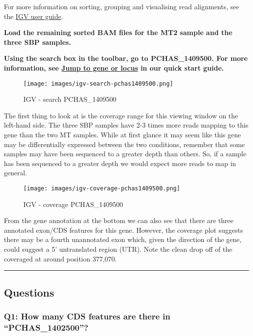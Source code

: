\documentclass[11pt]{article}
\begin{document}
    For more information on sorting, grouping and visualising read
alignments, see the
\href{http://software.broadinstitute.org/software/igv/UserGuide}{IGV
user guide}.

\textbf{Load the remaining sorted BAM files for the MT2 sample and the
three SBP samples.}

\textbf{Using the search box in the toolbar, go to PCHAS\_1409500. For
more information, see
\href{https://github.com/sanger-pathogens/pathogen-informatics-training/blob/master/Notebooks/IGV/index.ipynb}{Jump
to gene or locus} in our quick start guide.}

    \begin{figure}[!h]
\centering
\texttt{[image: images/igv-search-pchas1409500.png]}
\caption{IGV - search PCHAS\_1409500}
\end{figure}

    The first thing to look at is the coverage range for this viewing window
on the left-hand side. The three SBP samples have 2-3 times more reads
mapping to this gene than the two MT samples. While at first glance it
may seem like this gene may be differentially expressed between the two
conditions, remember that some samples may have been sequenced to a
greater depth than others. So, if a sample has been sequenced to a
greater depth we would expect more reads to map in general.

    \begin{figure}[!h]
\centering
\texttt{[image: images/igv-coverage-pchas1409500.png]}
\caption{IGV - coverage PCHAS\_1409500}
\end{figure}

\newpage


    From the gene annotation at the bottom we can also see that there are
three annotated exon/CDS features for this gene. However, the coverage
plot suggests there may be a fourth unannotated exon which, given the
direction of the gene, could suggest a 5' untranslated region (UTR).
Note the clean drop off of the coveraged at around position 377,070.

    \begin{center}\rule{0.5\linewidth}{.4pt}\end{center}

    \hypertarget{questions}{%
\subsection{Questions}\label{questions}}

\hypertarget{q1-how-many-cds-features-are-there-in-pchas_1402500}{%
\subsubsection{Q1: How many CDS features are there in
``PCHAS\_1402500''?}\label{q1-how-many-cds-features-are-there-in-pchas_1402500}}
\end{document}
